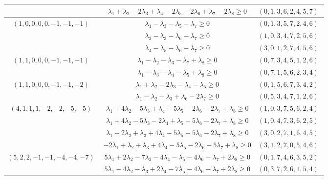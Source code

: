 \documentclass[11pt]{article}
\begin{document}
\begin{longtable}[l]{|c|c|c|}
 \cline{2-3} 
 & $\lambda_{1} + \lambda_{2}-2\lambda_{3} + \lambda_{4}-2\lambda_{5}-2\lambda_{6} + \lambda_{7}-2\lambda_{8}\geq 0$ & $(0 ,1 ,3 ,6 ,2 ,4 ,5 ,7) \;$\\ \hline\multirow[t]{3}{*}{ $(1 ,0 ,0 ,0 ,0 ,-1 ,-1 ,-1) \;$ }  & $\lambda_{1}-\lambda_{3}-\lambda_{5}-\lambda_{7}\geq 0$ & $(0 ,1 ,3 ,5 ,7 ,2 ,4 ,6) \;$\\ 
 \cline{2-3} 
 & $\lambda_{2}-\lambda_{3}-\lambda_{6}-\lambda_{7}\geq 0$ & $(1 ,0 ,3 ,4 ,7 ,2 ,5 ,6) \;$\\ 
 \cline{2-3} 
 & $\lambda_{4}-\lambda_{5}-\lambda_{6}-\lambda_{7}\geq 0$ & $(3 ,0 ,1 ,2 ,7 ,4 ,5 ,6) \;$\\ \hline\multirow[t]{2}{*}{ $(1 ,1 ,0 ,0 ,0 ,-1 ,-1 ,-1) \;$ }  & $\lambda_{1}-\lambda_{2}-\lambda_{3}-\lambda_{7} + \lambda_{8}\geq 0$ & $(0 ,7 ,3 ,4 ,5 ,1 ,2 ,6) \;$\\ 
 \cline{2-3} 
 & $\lambda_{1}-\lambda_{3}-\lambda_{4}-\lambda_{5} + \lambda_{8}\geq 0$ & $(0 ,7 ,1 ,5 ,6 ,2 ,3 ,4) \;$\\ \hline\multirow[t]{2}{*}{ $(1 ,1 ,0 ,0 ,0 ,-1 ,-1 ,-2) \;$ }  & $\lambda_{1} + \lambda_{2}-2\lambda_{3}-\lambda_{4}-\lambda_{5}\geq 0$ & $(0 ,1 ,5 ,6 ,7 ,3 ,4 ,2) \;$\\ 
 \cline{2-3} 
 & $\lambda_{1}-\lambda_{2}-\lambda_{3} + \lambda_{6}-2\lambda_{7}\geq 0$ & $(0 ,5 ,3 ,4 ,7 ,1 ,2 ,6) \;$\\ \hline\multirow[t]{4}{*}{ $(4 ,1 ,1 ,1 ,-2 ,-2 ,-5 ,-5) \;$ }  & $\lambda_{1} + 4\lambda_{2}-5\lambda_{3} + \lambda_{4}-5\lambda_{5}-2\lambda_{6}-2\lambda_{7} + \lambda_{8}\geq 0$ & $(1 ,0 ,3 ,7 ,5 ,6 ,2 ,4) \;$\\ 
 \cline{2-3} 
 & $\lambda_{1} + 4\lambda_{2}-5\lambda_{3}-2\lambda_{4} + \lambda_{5}-5\lambda_{6}-2\lambda_{7} + \lambda_{8}\geq 0$ & $(1 ,0 ,4 ,7 ,3 ,6 ,2 ,5) \;$\\ 
 \cline{2-3} 
 & $\lambda_{1}-2\lambda_{2} + \lambda_{3} + 4\lambda_{4}-5\lambda_{5}-5\lambda_{6}-2\lambda_{7} + \lambda_{8}\geq 0$ & $(3 ,0 ,2 ,7 ,1 ,6 ,4 ,5) \;$\\ 
 \cline{2-3} 
 & $-2\lambda_{1} + \lambda_{2} + \lambda_{3} + 4\lambda_{4}-5\lambda_{5}-2\lambda_{6}-5\lambda_{7} + \lambda_{8}\geq 0$ & $(3 ,1 ,2 ,7 ,0 ,5 ,4 ,6) \;$\\ \hline\multirow[t]{5}{*}{ $(5 ,2 ,2 ,-1 ,-1 ,-4 ,-4 ,-7) \;$ }  & $5\lambda_{1} + 2\lambda_{2}-7\lambda_{3}-4\lambda_{4}-\lambda_{5}-4\lambda_{6}-\lambda_{7} + 2\lambda_{8}\geq 0$ & $(0 ,1 ,7 ,4 ,6 ,3 ,5 ,2) \;$\\ 
 \cline{2-3} 
 & $5\lambda_{1}-4\lambda_{2}-\lambda_{3} + 2\lambda_{4}-7\lambda_{5}-4\lambda_{6}-\lambda_{7} + 2\lambda_{8}\geq 0$ & $(0 ,3 ,7 ,2 ,6 ,1 ,5 ,4) \;$\\ 

\end{longtable}
\end{document}
